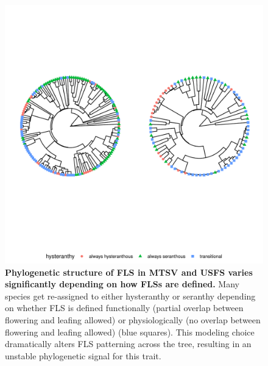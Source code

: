 \documentclass[12pt]{article}\usepackage[]{graphicx}\usepackage[]{color}
\begin{document}
\begin{figure}[H]

\includegraphics[width=7.5in]{figure/Code_chunk_Minimal_example3-1} 

   
  \caption{\textbf{Phylogenetic structure of FLS in MTSV and USFS varies significantly depending on how FLSs are defined.} Many species get re-assigned to either hysteranthy or seranthy depending on whether FLS is defined functionally (partial overlap between flowering and leafing allowed) or physiologically (no overlap between flowering and leafing allowed) (blue squares). This modeling choice dramatically alters FLS patterning across the tree, resulting in an unstable phylogenetic signal for this trait.}
    \label{fig:phylogeny}
    \end{figure}

\pagebreak[4]


\section*{}\label{Methods S1}
\end{document}
